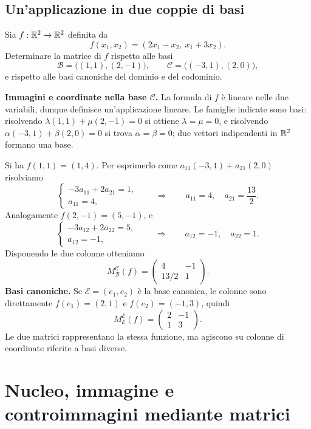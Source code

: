 \subsection{Un'applicazione in due coppie di basi}
\begin{esercizio}
Sia $f:\mathbb{R}^2\to\mathbb{R}^2$ definita da
\[
 f(x_1,x_2)=(2x_1-x_2,\ x_1+3x_2).
\]
Determinare la matrice di $f$ rispetto alle basi
\[
 \mathcal B=\bigl((1,1),(2,-1)\bigr),\qquad
 \mathcal C=\bigl((-3,1),(2,0)\bigr),
\]
e rispetto alle basi canoniche del dominio e del codominio.
\end{esercizio}
\begin{svolgimento}
\textbf{Immagini e coordinate nella base $\mathcal C$.} La formula di $f$ è lineare nelle due variabili, dunque definisce un'applicazione lineare. Le famiglie indicate sono basi: risolvendo $\lambda(1,1)+\mu(2,-1)=0$ si ottiene $\lambda=\mu=0$, e risolvendo $\alpha(-3,1)+\beta(2,0)=0$ si trova $\alpha=\beta=0$; due vettori indipendenti in $\mathbb{R}^2$ formano una base.

Si ha $f(1,1)=(1,4)$. Per esprimerlo come $a_{11}(-3,1)+a_{21}(2,0)$ risolviamo
\[
 \begin{cases}-3a_{11}+2a_{21}=1,\\a_{11}=4,\end{cases}
 \qquad\Longrightarrow\qquad a_{11}=4,\quad a_{21}=\frac{13}{2}.
\]
Analogamente $f(2,-1)=(5,-1)$, e
\[
 \begin{cases}-3a_{12}+2a_{22}=5,\\a_{12}=-1,\end{cases}
 \qquad\Longrightarrow\qquad a_{12}=-1,\quad a_{22}=1.
\]
Disponendo le due colonne otteniamo
\[
 M_{\mathcal B}^{\mathcal C}(f)=\begin{pmatrix}4&-1\\13/2&1\end{pmatrix}.
\]
\textbf{Basi canoniche.} Se $\mathcal E=(e_1,e_2)$ è la base canonica, le colonne sono direttamente $f(e_1)=(2,1)$ e $f(e_2)=(-1,3)$, quindi
\[
 M_{\mathcal E}^{\mathcal E}(f)=\begin{pmatrix}2&-1\\1&3\end{pmatrix}.
\]
Le due matrici rappresentano la stessa funzione, ma agiscono su colonne di coordinate riferite a basi diverse.
\end{svolgimento}

\section{Nucleo, immagine e controimmagini mediante matrici}
